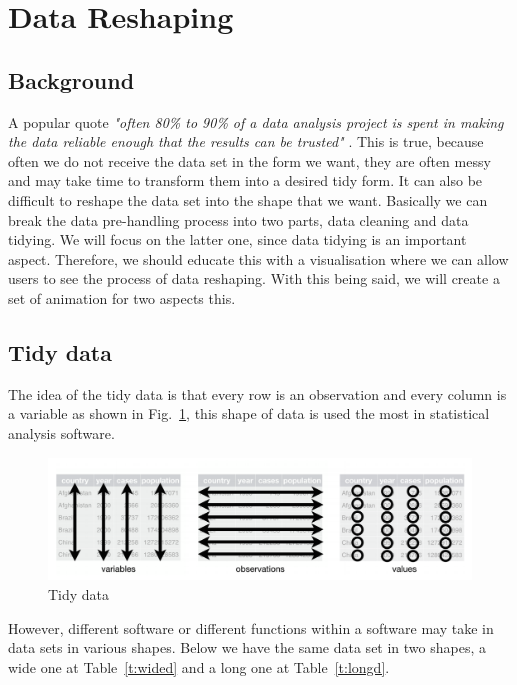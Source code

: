 \section{Data Reshaping}
\subsection{Background}
A popular quote \textit{"often 80\% to 90\% of a data analysis project is spent in making the data reliable enough that the results can be trusted"} \citep{Johnson2003DataQA}.  This is true, because often we do not receive the data set in the form we want, they are often messy and may take time to transform them into a desired tidy form. It can also be difficult to reshape the data set into the shape that we want.  Basically we can break the data pre-handling process into two parts, data cleaning and data tidying. We will focus on the latter one, since data tidying is an important aspect. Therefore, we should educate this with a visualisation where we can allow users to see the process of data reshaping. With this being said, we will create a set of animation for two aspects this.

\subsection{Tidy data}
The idea of the tidy data is that every row is an observation and every column is a variable as shown in Fig.~\ref{fig:hadtidyd}, this shape of data is used the most in statistical analysis software. \\

\begin{figure}[H]
    \includegraphics[scale = 0.35]{Masters-Thesis/img/hadtidyd.png}
    \caption{Tidy data \citep{Wickham:2017:RDS:3086927}}
    \label{fig:hadtidyd}
\end{figure}

However, different software or different functions within a software may take in data sets in various shapes. Below we have the same data set in two shapes, a wide one at Table~\ref{t:wided} and a long one at Table~\ref{t:longd}. \\

